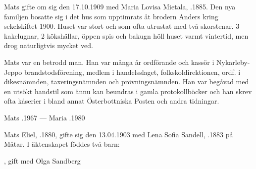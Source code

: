 Mats gifte om sig den 17.10.1909 med Maria Lovisa Mietala, .1885. Den nya familjen bosatte sig i det hus som upptimrats åt brodern Anders kring sekelskiftet 1900. Huset var stort och som ofta utrustat med två skorstenar. 3 kakelugnar, 2 kökshällar, öppen spis och bakugn höll huset varmt vintertid, men drog naturligtvis mycket ved.

Mats var en betrodd man. Han var många år ordförande och kassör i Nykarleby-Jeppo brandstodsförening, medlem i handelsslaget, folkskoldirektionen, ordf. i dikesnämnden, taxeringsnämnden och prövningsnämnden. Han var begåvad med en utsökt handstil som ännu kan beundras i gamla protokollböcker och han skrev ofta kåserier i bland annat Österbottniska Posten och andra tidningar.
\begin{jhchildren}
  \item {}
  \item {}
  \item {}
  \item {}
  \item {}
  \item {}
  \item {}
  \item {}
  \item {}
\end{jhchildren}

Mats .1967  ---  Maria .1980


Mats Eliel, .1880, gifte sig den 13.04.1903 med Lena Sofia Sandell, .1883 på Måtar. I äktenskapet föddes två barn:
\begin{jhchildren}
  \item {}, gift med Olga Sandberg
  \item {}
\end{jhchildren}

